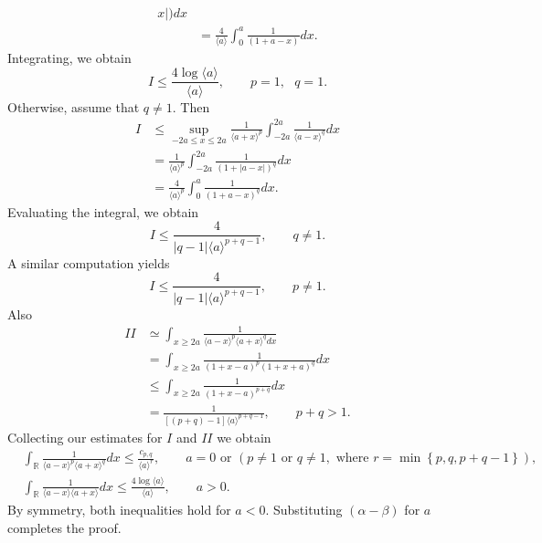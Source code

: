 \documentclass[12pt,reqno]{amsart}
\numberwithin{equation}{section}  %
\newcommand{\rr}{\mathbb{R}}
\begin{document}
\begin{appendices}
\begin{equation*}
\begin{split}
{  x
  |)} d x
  \\
  & = \frac{4}{\langle a \rangle } \int_{0}^{a} \frac{1}{(1 + a -
  x)} d x.
\end{split}
\end{equation*}
%
%
Integrating, we obtain
%
%
\begin{equation*}
 I
 \le 
 \frac{4 \log \langle a \rangle }{\langle a \rangle }, \qquad p =1, \text{ }q =1.
\end{equation*}
Otherwise, assume that $q \neq 1$. Then
\begin{equation*}
\begin{split}
  I
  & \le \sup_{-2a \le x \le 2a} \frac{1}{\langle a + x \rangle
  ^{p}} \int_{-2a}^{2a} \frac{1}{\langle a - x \rangle ^{q}} d x
  \\
  & = \frac{1}{\langle a \rangle ^{p}} \int_{-2a}^{2a} \frac{1}{(1 + | a -
  x
  |)^{q}} d x
  \\
  & = \frac{4}{\langle a \rangle ^{p}} \int_{0}^{a} \frac{1}{(1 + a -
  x)^{q}} d x.
\end{split}
\end{equation*}
Evaluating the integral, we obtain
\begin{equation*}
  I \le \frac{4}{|q-1| \langle a \rangle ^{p +q -1}}, \qquad q \neq 1.
\end{equation*}
%
%
A similar computation yields
\begin{equation*}
  I \le \frac{4}{|q-1| \langle a \rangle ^{p +q -1}}, \qquad p \neq 1.
\end{equation*}
%
%
Also
%
%
\begin{equation*}
\begin{split}
  II 
  & \simeq \int_{x \ge 2a} \frac{1}{\langle a - x \rangle ^{p} \langle a
  + x \rangle ^{q} d x}
  \\ 
  & = \int_{x \ge 2a} \frac{1}{(1 + x - a)^{p} (1 + x +
  a)^{q}} d x
  \\
  & \le \int_{x \ge 2a} \frac{1}{(1 + x -a)^{p+q}} d x
  \\
  & = \frac{1}{[(p + q)-1] \langle a \rangle ^{p+q -1}}, \qquad p + q > 1.
\end{split}
\end{equation*}
%
%
Collecting our estimates for $I$ and $II$ we obtain
%
\begin{align*}
  & \int_{\rr} \frac{1}{\langle a - x \rangle ^{p} \langle a + x \rangle
  ^{q}} d x
  \le \frac{c_{p,q}}{\langle a \rangle ^{r}}, \qquad a = 0 \text{ or }
  (p \neq 1 \text{ or } q \neq 1, \text{ where }r =
  \min\left\{ p, q, p+q-1 \right\}), 
  \\
  & \int_{\rr} \frac{1}{\langle a - x \rangle  \langle a + x \rangle
  } d x
  \le  \frac{4 \log \langle a \rangle }{\langle a \rangle }, \qquad a > 0.
  \label{est-2}
\end{align*}
By symmetry, both inequalities  hold for $a < 0$. Substituting $(\alpha -
\beta)$ for $a$ completes the proof. \qquad \qedsymbol
%
%

\end{appendices}
\end{document}
